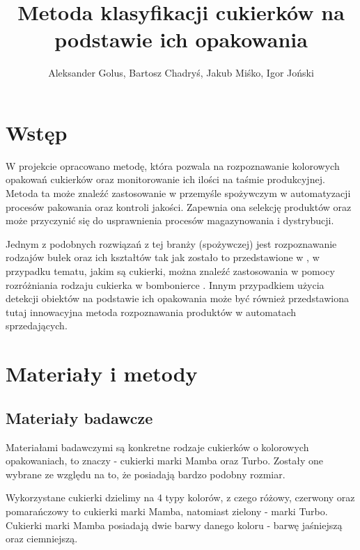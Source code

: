 \documentclass{article}
\title{Metoda klasyfikacji cukierków na podstawie ich opakowania}
\author{Aleksander Golus, Bartosz Chadryś, Jakub Miśko, Igor Joński}
\begin{document}
\maketitle

\newpage


\section{Wstęp}
\label{Wstęp}
W projekcie opracowano metodę, która pozwala na rozpoznawanie kolorowych opakowań cukierków oraz monitorowanie ich ilości na taśmie produkcyjnej. Metoda ta może znaleźć zastosowanie w przemyśle spożywczym w automatyzacji procesów pakowania oraz kontroli jakości. Zapewnia ona selekcję produktów oraz może przyczynić się do usprawnienia procesów magazynowania i dystrybucji.

Jednym z podobnych rozwiązań z tej branży (spożywczej) jest rozpoznawanie rodzajów bułek oraz ich kształtów tak jak zostało to przedstawione w \cite{virtuslab}, w przypadku tematu, jakim są cukierki, można znaleźć zastosowania w pomocy rozróżniania rodzaju cukierka w bombonierce \cite{chocolates}. Innym przypadkiem użycia detekcji obiektów na podstawie ich opakowania może być również przedstawiona tutaj \cite{vending} innowacyjna metoda rozpoznawania produktów w automatach sprzedających.

\section{Materiały i metody}
\label{Materiały i metody}
\subsection{Materiały badawcze}
\label{Materiały badawcze}
Materiałami badawczymi są konkretne rodzaje cukierków o kolorowych opakowaniach, to znaczy - cukierki marki Mamba oraz Turbo. Zostały one wybrane ze względu na to, że posiadają bardzo podobny rozmiar.

Wykorzystane cukierki dzielimy na 4 typy kolorów, z czego różowy, czerwony oraz pomarańczowy to cukierki marki Mamba, natomiast zielony - marki Turbo. Cukierki marki Mamba posiadają dwie barwy danego koloru - barwę jaśniejszą oraz ciemniejszą.
\end{document}
